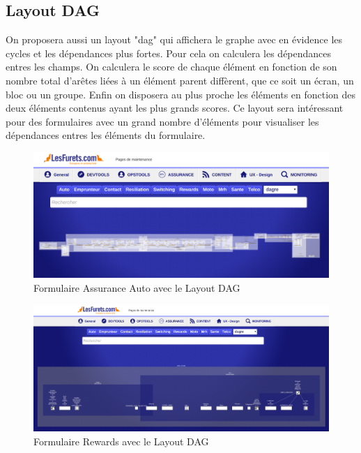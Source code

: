 \subsection{Layout DAG}
On proposera aussi un layout "dag" qui affichera le graphe avec en évidence les cycles et les dépendances plus fortes. Pour cela on calculera les dépendances entres les champs. On calculera le score de chaque élément en fonction de son nombre total d'arêtes liées à un élément parent diffèrent, que ce soit un écran, un bloc ou un groupe. Enfin on disposera au plus proche les éléments en fonction des deux éléments contenus ayant les plus grands scores. Ce layout sera intéressant pour des formulaires avec un grand nombre d'éléments pour visualiser les dépendances entres les éléments du formulaire.
\vspace{0.5in}
\begin{figure}[!h]
\centering
\includegraphics[width=15cm]{outil/layout-dagre.png}
\caption{Formulaire Assurance Auto avec le Layout DAG}
\end{figure}
\begin{figure}[!h]
\centering
\includegraphics[width=15cm]{outil/layout-dag-2.png}
\caption{Formulaire Rewards avec le Layout DAG}
\end{figure}
\clearpage
